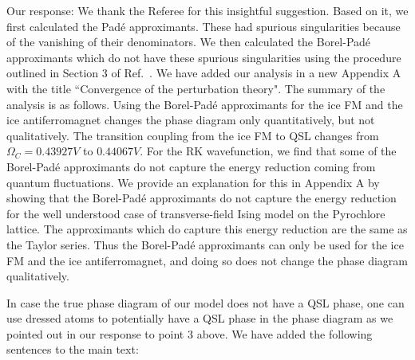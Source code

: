 \documentclass[
onecolumn,
superscriptaddress,
longbibliography,
nofootinbib,
 amsmath,amssymb,
 aps,
prb
]{revtex4-2}
\newcommand{\response}[1]{\textcolor{Mulberry}{#1}}
\newcommand{\wesay}[1]{
	\begin{leftborder}
		\color{BrickRed}{#1}
	\end{leftborder}
}
\begin{document}
\begin{enumerate}
\response{Our response: We thank the Referee for this insightful suggestion.
Based on it, we first calculated the Pad\'e approximants. These had spurious singularities because of the vanishing of their denominators. We then calculated the Borel-Pad\'e approximants which do not have these spurious singularities using the procedure outlined in Section 3 of Ref.~\cite{deeb2016comparison}. We have added our analysis in a new Appendix A with the title ``Convergence of the perturbation theory". The summary of the analysis is as follows. Using the Borel-Pad\'e approximants for the ice FM and the ice antiferromagnet changes the phase diagram only quantitatively, but not qualitatively. The transition coupling from the ice FM to QSL changes from $\Omega_C = 0.43927 V$ to $0.44067 V$. For the RK wavefunction, we find that some of the Borel-Pad\'e approximants do not capture the energy reduction coming from quantum fluctuations. We provide an explanation for this in Appendix A by showing that the Borel-Pad\'e approximants do not capture the energy reduction for the well understood case of transverse-field Ising model on the Pyrochlore lattice. The approximants which do capture this energy reduction are the same as the Taylor series. Thus the Borel-Pad\'e approximants can only be used for the ice FM and the ice antiferromagnet, and doing so does not change the phase diagram qualitatively.}

\response{In case the true phase diagram of our model does not have a QSL phase, one can use dressed atoms to potentially have a QSL phase in the phase diagram as we pointed out in our response to point 3 above. We have added the following sentences to the main text:}

\wesay{In Appendix~A, we further address the issue of the convergence of the perturbation theory by calculating the Borel-Pad\'e approximants of the perturbative energies of the three ansatz states. We find that using the Borel-Pad\'e approximants for the ice FM and the ice antiferromagnet does not change the phase diagram qualitatively, while the Borel-Pad\'e approximant for the RK wavefunction does not capture the energy reduction coming from  quantum fluctuations. However, rigorously ascertaining the convergence of our perturbative expansion is beyond the scope of this work.}


\end{enumerate}
\end{document}
